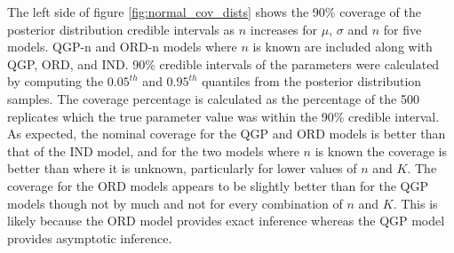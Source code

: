 \documentclass[preprint,12pt,authoryear]{elsarticle}
\begin{document}
The left side of figure \ref{fig:normal_cov_dists} shows the 90\% coverage of the posterior distribution credible intervals as $n$ increases for $\mu$, $\sigma$ and $n$ for five models. QGP-n and ORD-n models where $n$ is known are included along with QGP, ORD, and IND. 90\% credible intervals of the parameters were calculated by computing the $0.05^{th}$ and $0.95^{th}$ quantiles from the posterior distribution samples. The coverage percentage is calculated as the percentage of the 500 replicates which the true parameter value was within the 90\% credible interval.
As expected, the nominal coverage for the QGP and ORD models is better than that of the IND model, and for the two models where $n$ is known the coverage is better than where it is unknown, particularly for lower values of $n$ and $K$. The coverage for the ORD models appears to be slightly better than for the QGP models though not by much and not for every combination of $n$ and $K$. This is likely because the ORD model provides exact inference whereas the QGP model provides asymptotic inference.
\end{document}
